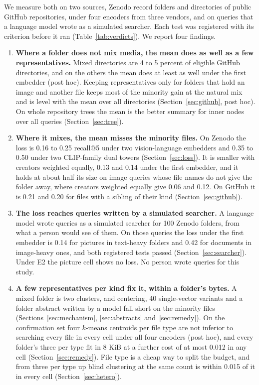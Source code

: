 \documentclass[sigconf,natbib=true,anonymous=true]{acmart}
\begin{document}
We measure both on two sources, Zenodo record folders and directories of public GitHub repositories, under four encoders from three vendors, and on queries that a language model wrote as a simulated searcher. Each test was registered with its criterion before it ran (Table~\ref{tab:verdicts}). We report four findings.

\begin{enumerate}
\item \textbf{Where a folder does not mix media, the mean does as well as a few representatives.} Mixed directories are 4 to 5 percent of eligible GitHub directories, and on the others the mean does at least as well under the first embedder (post hoc). Keeping representatives only for folders that hold an image and another file keeps most of the minority gain at the natural mix and is level with the mean over all directories (Section~\ref{sec:github}, post hoc). On whole repository trees the mean is the better summary for inner nodes over all queries (Section~\ref{sec:tree}).
\item \textbf{Where it mixes, the mean misses the minority files.} On Zenodo the loss is 0.16 to 0.25 recall@5 under two vision-language embedders and 0.35 to 0.50 under two CLIP-family dual towers (Section~\ref{sec:loss}). It is smaller with creators weighted equally, 0.13 and 0.14 under the first embedder, and it holds at about half its size on image queries whose file names do not give the folder away, where creators weighted equally give 0.06 and 0.12. On GitHub it is 0.21 and 0.20 for files with a sibling of their kind (Section~\ref{sec:github}).
\item \textbf{The loss reaches queries written by a simulated searcher.} A language model wrote queries as a simulated searcher for 100 Zenodo folders, from what a person would see of them. On those queries the loss under the first embedder is 0.14 for pictures in text-heavy folders and 0.42 for documents in image-heavy ones, and both registered tests passed (Section~\ref{sec:searcher}). Under E2 the picture cell shows no loss. No person wrote queries for this study.
\item \textbf{A few representatives per kind fix it, within a folder's bytes.} A mixed folder is two clusters, and centering, 40 single-vector variants and a folder abstract written by a model fall short on the minority files (Sections~\ref{sec:mechanism}, \ref{sec:abstracts} and~\ref{sec:remedy}). On the confirmation set four $k$-means centroids per file type are not inferior to searching every file in every cell under all four encoders (post hoc), and every folder's three per type fit in 8 KiB at a further cost of at most 0.012 in any cell (Section~\ref{sec:remedy}). File type is a cheap way to split the budget, and from three per type up blind clustering at the same count is within 0.015 of it in every cell (Section~\ref{sec:hetero}).
\end{enumerate}
\end{document}
